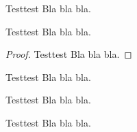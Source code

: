 \documentclass{article}
\begin{document}
\begin{definition}{Test}{test}
	Bla bla bla.
\end{definition}
\begin{theorem}{Test}{test}
	Bla bla bla.
\end{theorem}
\begin{proof}{Test}{test}
	Bla bla bla.
\end{proof}
\begin{example}{Test}{test}
	Bla bla bla.
\end{example}
\begin{note}{Test}{test}
	Bla bla bla.
\end{note}
\begin{challenge}{Test}{test}
	Bla bla bla.
\end{challenge}
\end{document}
